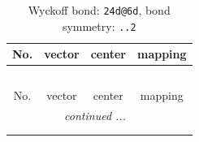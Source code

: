 \documentclass[fleqn,8pt]{jsarticle}
\begin{document}
\renewcommand{\arraystretch}{1.2}
\begin{longtable}{cccc}
\caption{Wyckoff bond: {\tt 24d@6d}, bond symmetry: {\tt ..2}}
 \\
 \hline \hline
No. & vector & center & mapping \\ \hline \endfirsthead

\multicolumn{3}{l}{\tablename\ \thetable{}} \\
 \hline \hline
No. & vector & center & mapping \\ \hline \endhead

 \hline \hline
\multicolumn{3}{r}{\footnotesize\it continued ...} \\ \endfoot

 \hline \hline
\multicolumn{3}{r}{} \\ \endlastfoot


\end{longtable}
\end{document}
